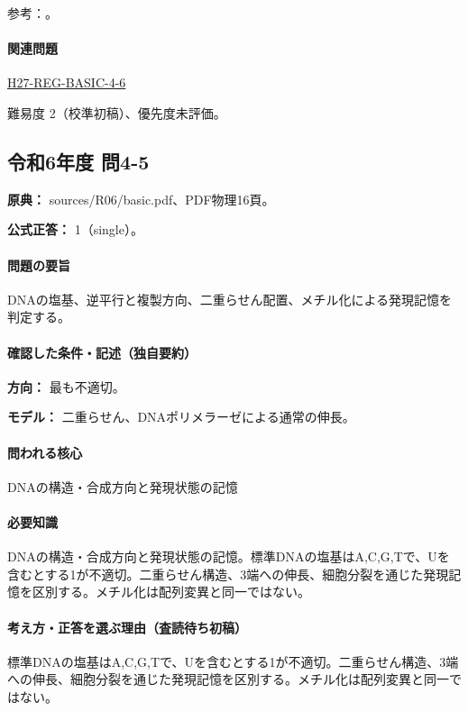 \par 参考：\cite{nhgri_dna}。

\paragraph{関連問題} \hyperref[q:h27-reg-basic-4-6]{H27-REG-BASIC-4-6}

\par 難易度 2（校準初稿）、優先度未評価。

\subsection{令和6年度 問4-5}
\label{q:r06-reg-basic-4-5}

\noindent\textbf{原典：} sources/R06/basic.pdf、PDF物理16頁。

\textbf{公式正答：} 1（single）。

\paragraph{問題の要旨} DNAの塩基、逆平行と複製方向、二重らせん配置、メチル化による発現記憶を判定する。

\paragraph{確認した条件・記述（独自要約）}\mbox{}\par

\noindent\textbf{方向：} 最も不適切。\par

\noindent\textbf{モデル：} 二重らせん、DNAポリメラーゼによる通常の伸長。\par

\paragraph{問われる核心} DNAの構造・合成方向と発現状態の記憶

\paragraph{必要知識} DNAの構造・合成方向と発現状態の記憶。標準DNAの塩基はA,C,G,Tで、Uを含むとする1が不適切。二重らせん構造、3端への伸長、細胞分裂を通じた発現記憶を区別する。メチル化は配列変異と同一ではない。

\paragraph{考え方・正答を選ぶ理由（査読待ち初稿）} 標準DNAの塩基はA,C,G,Tで、Uを含むとする1が不適切。二重らせん構造、3端への伸長、細胞分裂を通じた発現記憶を区別する。メチル化は配列変異と同一ではない。

